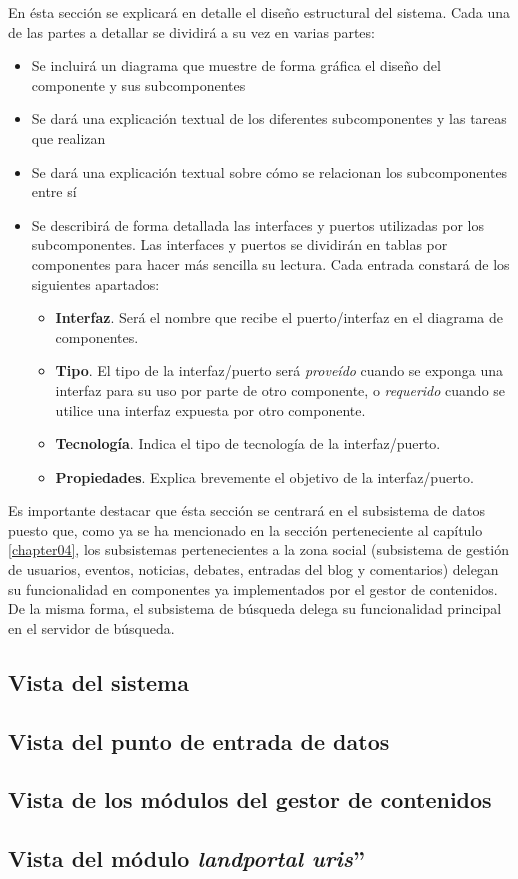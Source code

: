 En ésta sección se explicará en detalle el diseño estructural del sistema.  Cada una de las partes a detallar se dividirá a su vez en varias partes:
\begin{itemize}
	\item Se incluirá un diagrama que muestre de forma gráfica el diseño del componente y sus subcomponentes
	\item Se dará una explicación textual de los diferentes subcomponentes y las tareas que realizan
	\item Se dará una explicación textual sobre cómo se relacionan los subcomponentes entre sí
	\item Se describirá de forma detallada las interfaces y puertos utilizadas por los subcomponentes.  Las interfaces y puertos se dividirán en tablas por componentes para hacer más sencilla su lectura.	Cada entrada constará de los siguientes apartados:
	\begin{itemize}
		\item \textbf{Interfaz}.  Será el nombre que recibe el puerto/interfaz en el diagrama de componentes.
		\item \textbf{Tipo}.  El tipo de la interfaz/puerto será \textit{proveído} cuando se exponga una interfaz para su uso por parte de otro componente, o \textit{requerido} cuando se utilice una interfaz expuesta por otro componente.
		\item \textbf{Tecnología}.  Indica el tipo de tecnología de la interfaz/puerto.
		\item \textbf{Propiedades}.  Explica brevemente el objetivo de la interfaz/puerto.
	\end{itemize}
\end{itemize}

Es importante destacar que ésta sección se centrará en el subsistema de datos puesto que, como ya se ha mencionado en la sección  perteneciente al capítulo \ref{chapter04}, los subsistemas pertenecientes a la zona social (subsistema de gestión de usuarios, eventos, noticias, debates, entradas del blog y comentarios) delegan su funcionalidad en componentes ya implementados por el gestor de contenidos.  De la misma forma, el subsistema de búsqueda delega su funcionalidad principal en el servidor de búsqueda.

\subsection{Vista del sistema}
\label{vista_sistema}



\subsection{Vista del punto de entrada de datos}
\label{vista_receiver}



\subsection{Vista de los módulos del gestor de contenidos}
\label{vista_modulos_cms}

\subsection{Vista del módulo \textit{landportal uris}''}
\label{vista_landportal_uris}